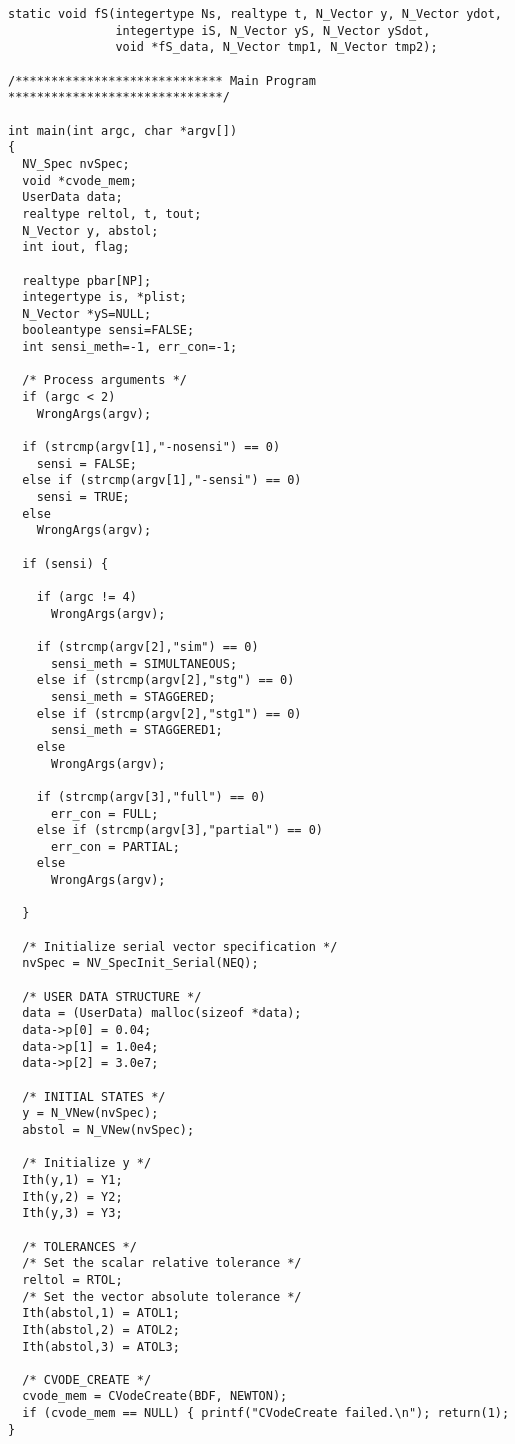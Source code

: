 \begin{verbatim}
static void fS(integertype Ns, realtype t, N_Vector y, N_Vector ydot, 
               integertype iS, N_Vector yS, N_Vector ySdot, 
               void *fS_data, N_Vector tmp1, N_Vector tmp2);

/***************************** Main Program ******************************/

int main(int argc, char *argv[])
{
  NV_Spec nvSpec;
  void *cvode_mem;
  UserData data;
  realtype reltol, t, tout;
  N_Vector y, abstol;
  int iout, flag;

  realtype pbar[NP];
  integertype is, *plist; 
  N_Vector *yS=NULL;
  booleantype sensi=FALSE;
  int sensi_meth=-1, err_con=-1;

  /* Process arguments */
  if (argc < 2)
    WrongArgs(argv);

  if (strcmp(argv[1],"-nosensi") == 0)
    sensi = FALSE;
  else if (strcmp(argv[1],"-sensi") == 0)
    sensi = TRUE;
  else
    WrongArgs(argv);

  if (sensi) {

    if (argc != 4)
      WrongArgs(argv);

    if (strcmp(argv[2],"sim") == 0)
      sensi_meth = SIMULTANEOUS;
    else if (strcmp(argv[2],"stg") == 0)
      sensi_meth = STAGGERED;
    else if (strcmp(argv[2],"stg1") == 0)
      sensi_meth = STAGGERED1;
    else 
      WrongArgs(argv);

    if (strcmp(argv[3],"full") == 0)
      err_con = FULL;
    else if (strcmp(argv[3],"partial") == 0)
      err_con = PARTIAL;
    else
      WrongArgs(argv);

  }

  /* Initialize serial vector specification */
  nvSpec = NV_SpecInit_Serial(NEQ);

  /* USER DATA STRUCTURE */
  data = (UserData) malloc(sizeof *data);
  data->p[0] = 0.04;
  data->p[1] = 1.0e4;
  data->p[2] = 3.0e7;

  /* INITIAL STATES */
  y = N_VNew(nvSpec);
  abstol = N_VNew(nvSpec);

  /* Initialize y */
  Ith(y,1) = Y1;
  Ith(y,2) = Y2;
  Ith(y,3) = Y3;

  /* TOLERANCES */
  /* Set the scalar relative tolerance */
  reltol = RTOL;               
  /* Set the vector absolute tolerance */
  Ith(abstol,1) = ATOL1;       
  Ith(abstol,2) = ATOL2;
  Ith(abstol,3) = ATOL3;

  /* CVODE_CREATE */
  cvode_mem = CVodeCreate(BDF, NEWTON);
  if (cvode_mem == NULL) { printf("CVodeCreate failed.\n"); return(1); }


\end{verbatim}
